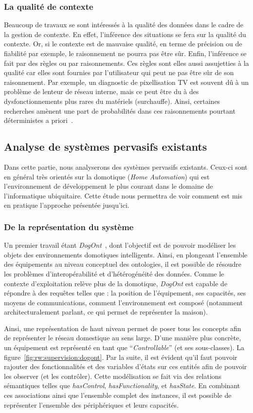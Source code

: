 \subsubsection{La qualité de contexte}
Beaucoup de travaux se sont intéressés à la qualité des données dans le cadre de la gestion de contexte. En effet, l'inférence des situations se fera sur la qualité du contexte. Or, si le contexte est de mauvaise qualité, en terme de précision ou de fiabilité par exemple, le raisonnement ne pourra pas être sûr. Enfin, l'inférence se fait par des règles ou par raisonnements. Ces règles sont elles aussi assujetties à la qualité car elles sont fournies par l'utilisateur qui peut ne pas être sûr de son raisonnement. Par exemple, un diagnostic de pixellisation TV est souvent dû à un problème de lenteur de réseau interne, mais ce peut être du à des dysfonctionnements plus rares du matériels (surchauffe). Ainsi, certaines recherches amènent une part de probabilités dans ces raisonnements pourtant déterministes a priori~\cite{Padovitz:agent}.

\subsection{Analyse de systèmes pervasifs existants}
Dans cette partie, nous analyserons des systèmes pervasifs existants. Ceux-ci sont en général très orientés sur la domotique (\textit{Home Automation}) qui est l'environnement de développement le plus courant dans le domaine de l'informatique ubiquitaire. Cette étude nous permettra de voir comment est mis en pratique l'approche présentée jusqu'ici.

\subsubsection{De la représentation du système}
Un premier travail étant \textit{DogOnt}~\cite{Bonino:dogont}, dont l'objectif est de pouvoir modéliser les objets des environnements domotiques intelligents. Ainsi, en plongeant l'ensemble des équipements au niveau conceptuel des ontologies, il est possible de résoudre les problèmes d'interopérabilité et d'hétérogénéité des données. Comme le contexte d'exploitation relève plus de la domotique, \textit{DogOnt} est capable de répondre à des requêtes telles que : la position de l'équipement, ses capacités, ses moyens de communications, comment l'environnement est composé (notamment architecturalement parlant, ce qui permet de représenter la maison).

Ainsi, une représentation de haut niveau permet de poser tous les concepts afin de représenter le réseau domestique au sens large. D'une manière plus concrète, un équipement est représenté en tant que \enquote{\it Controllable} (et ses sous-classes). La figure~\ref{fig:rw:supervision:dogont}. Par la suite, il est évident qu'il faut pouvoir rajouter des fonctionnalités et des variables d'états sur ces entités afin de pouvoir les observer (et les contrôler). Cette modélisation se fait via des relations sémantiques telles que \textit{hasControl}, \textit{hasFunctionality}, et \textit{hasState}. En combinant ces associations ainsi que l'ensemble complet des instances, il est possible de représenter l'ensemble des périphériques et leurs capacités.

